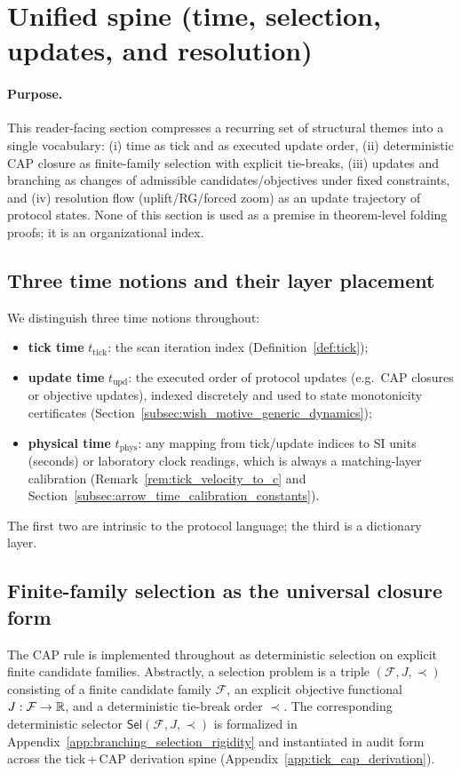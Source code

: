 \section*{Unified spine (time, selection, updates, and resolution)}
\label{sec:unified_spine}

\paragraph{Purpose.}
\AuditTag This reader-facing section compresses a recurring set of structural themes into a single vocabulary:
(i) time as tick and as executed update order,
(ii) deterministic CAP closure as finite-family selection with explicit tie-breaks,
(iii) updates and branching as changes of admissible candidates/objectives under fixed constraints,
and (iv) resolution flow (uplift/RG/forced zoom) as an update trajectory of protocol states.
None of this section is used as a premise in theorem-level folding proofs; it is an organizational index.

\subsection*{Three time notions and their layer placement}
\AuditTag We distinguish three time notions throughout:
\begin{itemize}
\item \textbf{tick time} $t_{\mathrm{tick}}$: the scan iteration index (Definition~\ref{def:tick});
\item \textbf{update time} $t_{\mathrm{upd}}$: the executed order of protocol updates (e.g.\ CAP closures or objective updates), indexed discretely and used to state monotonicity certificates (Section~\ref{subsec:wish_motive_generic_dynamics});
\item \textbf{physical time} $t_{\mathrm{phys}}$: any mapping from tick/update indices to SI units (seconds) or laboratory clock readings, which is always a matching-layer calibration (Remark~\ref{rem:tick_velocity_to_c} and Section~\ref{subsec:arrow_time_calibration_constants}).
\end{itemize}
\AuditTag The first two are intrinsic to the protocol language; the third is a dictionary layer.

\subsection*{Finite-family selection as the universal closure form}
\AuditTag The CAP rule is implemented throughout as deterministic selection on explicit finite candidate families.
Abstractly, a selection problem is a triple $(\mathcal{F},J,\prec)$ consisting of a finite candidate family $\mathcal{F}$,
an explicit objective functional $J:\mathcal{F}\to\mathbb{R}$, and a deterministic tie-break order $\prec$.
The corresponding deterministic selector $\mathsf{Sel}(\mathcal{F},J,\prec)$ is formalized in Appendix~\ref{app:branching_selection_rigidity}
and instantiated in audit form across the tick\,+\,CAP derivation spine (Appendix~\ref{app:tick_cap_derivation}).

